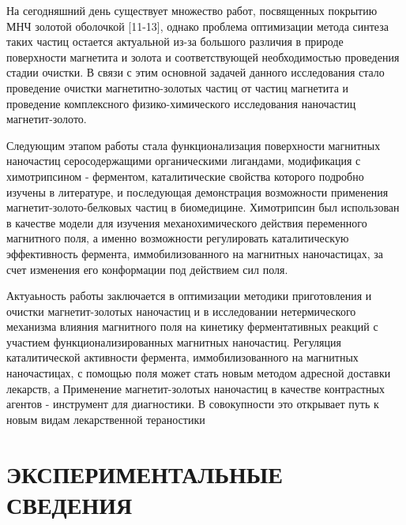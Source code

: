 \documentclass[12pt, a4paper]{article}
\begin{document}
На сегодняшний день существует множество работ, посвященных покрытию МНЧ золотой оболочкой [11-13], однако проблема
оптимизации метода синтеза таких частиц остается актуальной из-за большого различия в природе поверхности магнетита и золота и соответствующей необходимостью проведения стадии очистки. 
В связи с этим основной задачей данного исследования стало проведение очистки магнетитно-золотых частиц от частиц магнетита и проведение комплексного
физико-химического исследования наночастиц магнетит-золото.

Следующим этапом работы стала функционализация поверхности магнитных наночастиц серосодержащими органическими
лигандами, модификация с химотрипсином - ферментом, каталитические свойства которого подробно изучены в литературе, и
последующая демонстрация возможности применения магнетит-золото-белковых частиц в биомедицине. Химотрипсин был
использован в качестве модели для изучения механохимического действия переменного магнитного поля, а именно возможности регулировать
каталитическую эффективность фермента, иммобилизованного на магнитных наночастицах, за счет изменения его конформации под
действием сил поля.

Актуаьность работы заключается в оптимизации методики приготовления и очистки магнетит-золотых наночастиц и в исследовании нетермического механизма влияния магнитного поля на кинетику
ферментативных реакций с участием функционализированных магнитных наночастиц. Регуляция каталитической активности
фермента, иммобилизованного на магнитных наночастицах, с помощью поля может стать новым методом адресной доставки лекарств, а
Применение магнетит-золотых наночастиц в качестве контрастных агентов - инструмент для диагностики. В совокупности это открывает
путь к новым видам лекарственной тераностики

\section*{ЭКСПЕРИМЕНТАЛЬНЫЕ СВЕДЕНИЯ}
\end{document}
